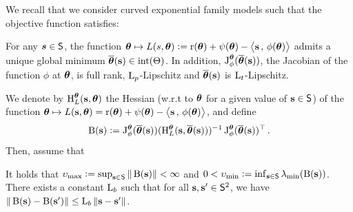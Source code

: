 \documentclass[bj]{imsart}
\numberwithin{equation}{section}
\theoremstyle{plain}
\begin{document}
\vspace{0.1in}

We recall that we consider curved exponential family models such that the objective function satisfies:
\begin{assumption} \label{ass:reg}
For any $\bm{s} \in \Sset$, the function $\param \mapsto L(s,\param) \eqdef \Pen( \param ) + \psi( \param) - \pscal{ \bss}{ \phi ( \param) }$ admits a unique global minimum $\mstep{\bss} \in {\rm int}(\Param)$.
In addition, $\jacob{\phi}{\param}{\overline{\param}(\bss )}$, the Jacobian of the function $\phi$ at $\param$, is full rank, $\Lip{p}$-Lipschitz and $\overline{\param}( \bss )$ is $\Lip{t}$-Lipschitz.
\end{assumption}
We denote by $\hess{L}{\param}(\bss,\param)$ the Hessian (w.r.t to $\param$ for a given value of $\bss \in \Sset$) of the function $\param \mapsto L(\bss,\param)= \Pen(\param) + \psi(\param) -\pscal{\bss}{\phi(\param)}$, and define 
$$\operatorname{B}( \bss ) \eqdef\jacob{ \phi }{ \param }{ \mstep{\bss} } ( \hess{L}{\param}( {\bss},  \mstep{\bss} )  )^{-1} \jacob{ \phi }{ \param }{ \mstep{\bss} }^\top \, .$$
Then, assume that
\begin{assumption}\label{ass:eigen}
It holds that $ \upsilon_{\max} \eqdef \sup_{\bss \in \Sset} \| \operatorname{B}( \bss ) \| < \infty$ and $0 < \upsilon_{\min}  \eqdef \inf_{\bss \in \Sset} \lambda_{\rm min} ( \operatorname{B}( \bss ) )$.
There exists a constant $\Lip{b}$ such that for all $\bss, \bss' \in \Sset^2$, we have $ \| \operatorname{B}( \bss ) - \operatorname{B}( \bss' )  \| \leq \Lip{b} \| {\bss} - {\bss}' \|$.
\end{assumption}

\vspace{0.1in}
\end{document}
